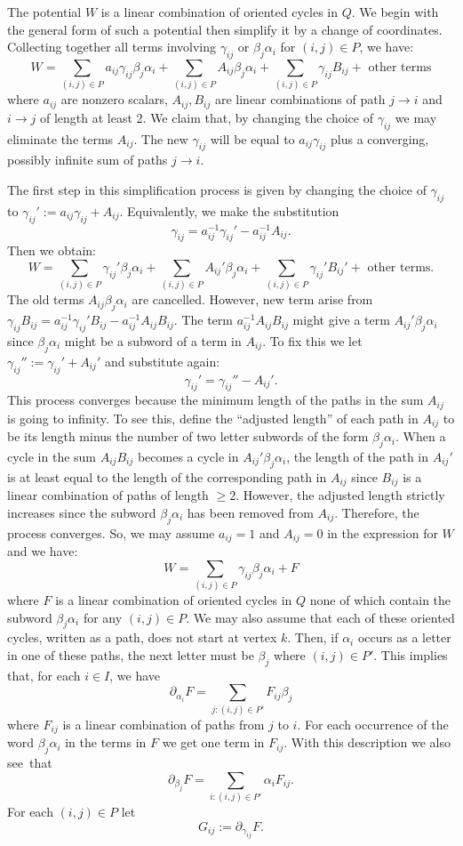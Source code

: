 \documentclass[10pt]{amsart}
\theoremstyle{definition}
\begin{document}
The potential $W$ is a linear combination of oriented cycles in $Q$. We begin with the general form of such a potential then simplify it by a change of coordinates. Collecting together all terms involving $\gamma_{ij}$ or $\beta_j\alpha_i$ for $(i,j)\in P$, we have:
\[
	W=\sum_{(i,j)\in P}a_{ij}\gamma_{ij}\beta_j\alpha_i+\sum_{(i,j)\in P}A_{ij}\beta_j\alpha_i+\sum_{(i,j)\in P}\gamma_{ij}B_{ij}+ \text{ other terms}
\]
where $a_{ij}$ are nonzero scalars, $A_{ij},B_{ij}$ are linear combinations of path $j\to i$ and $i\to j$ of length at least 2. We claim that, by changing the choice of $\gamma_{ij}$ we may eliminate the terms $A_{ij}$. The new $\gamma_{ij}$ will be equal to $a_{ij}\gamma_{ij}$ plus a converging, possibly infinite sum of paths $j\to i$.

The first step in this simplification process is given by changing the choice of $\gamma_{ij}$ to $\gamma_{ij}':=a_{ij}\gamma_{ij}+A_{ij}$. Equivalently, we make the substitution 
\[
\gamma_{ij}=a_{ij}^{-1}\gamma_{ij}'-a_{ij}^{-1}A_{ij}.
\]
Then we obtain:
\[
	W=\sum_{(i,j)\in P}\gamma_{ij}'\beta_j\alpha_i+\sum_{(i,j)\in P}A_{ij}'\beta_j\alpha_i+\sum_{(i,j)\in P}\gamma_{ij}'B_{ij}'+ \text{ other terms}.
\]
The old terms $A_{ij}\beta_j\alpha_i$ are cancelled. However, new term arise from $\gamma_{ij}B_{ij}=a_{ij}^{-1}\gamma_{ij}'B_{ij}-a_{ij}^{-1}A_{ij}B_{ij}$. The term $a_{ij}^{-1}A_{ij}B_{ij}$ might give a term $A_{ij}'\beta_j\alpha_i$ since $\beta_j\alpha_i$ might be a subword of a term in $A_{ij}$. To fix this we let $\gamma_{ij}'':=\gamma_{ij}'+A_{ij}'$ and substitute again:
\[
	\gamma_{ij}'=\gamma_{ij}''-A_{ij}'.
\]
This process converges because the minimum length of the paths in the sum $A_{ij}$ is going to infinity. To see this, define the ``adjusted length'' of each path in $A_{ij}$ to be its length minus the number of two letter subwords of the form $\beta_j\alpha_i$. When a cycle in the sum $A_{ij}B_{ij}$ becomes a cycle in $A_{ij}'\beta_j\alpha_i$, the length of the path in $A_{ij}'$ is at least equal to the length of the corresponding path in $A_{ij}$ since $B_{ij}$ is a linear combination of paths of length $\ge2$. However, the adjusted length strictly increases since the subword $\beta_j\alpha_i$ has been removed from $A_{ij}$. Therefore, the process converges. So, we may assume $a_{ij}=1$ and $A_{ij}=0$ in the expression for $W$ and we have:
\[
	W=\sum_{(i,j)\in P}\gamma_{ij}\beta_j\alpha_i+F
\]
where $F$ is a linear combination of oriented cycles in $Q$ none of which contain the subword $\beta_j\alpha_i$ for any $(i,j)\in P$. We may also assume that each of these oriented cycles, written as a path, does not start at vertex $k$. Then, if $\alpha_i$ occurs as a letter in one of these paths, the next letter must be $\beta_{j}$ where $(i,j)\in P'$. This implies that, for each $i\in I$, we have
\[
	\partial_{\alpha_i}F=\sum_{j:(i,j)\in P'} F_{ij}\beta_j
\]
where $F_{ij}$ is a linear combination of paths from $j$ to $i$. For each occurrence of the word $\beta_j\alpha_i$ in the terms in $F$ we get one term in $F_{ij}$. With this description we also see~that
\[
	\partial_{\beta_j}F=\sum_{i:(i,j)\in P'} \alpha_iF_{ij}.
\]
For each $(i,j)\in P$ let
\[
	G_{ij}:=\partial_{\gamma_{ij}}F.
\]
\end{document}
